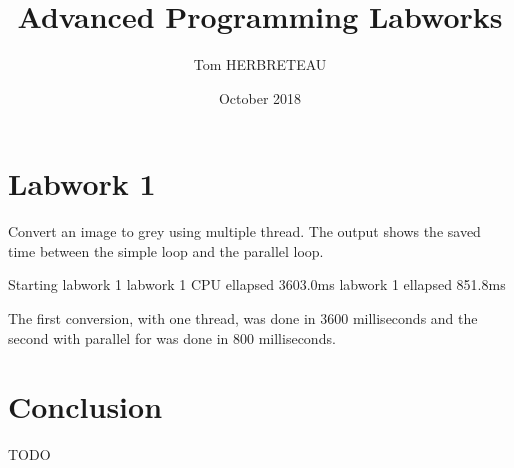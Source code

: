 \documentclass{article}
\title{Advanced Programming Labworks}
\author{Tom HERBRETEAU }
\date{October 2018}
\begin{document}
\maketitle

\section{Labwork 1}
Convert an image to grey using multiple thread. The output shows the saved time between the simple loop and the parallel loop.

\newline Starting labwork 1
\newline labwork 1 CPU ellapsed 3603.0ms
\newline labwork 1 ellapsed 851.8ms

The first conversion, with one thread, was done in 3600 milliseconds and the second with parallel for was done in 800 milliseconds.
\section{Conclusion}
TODO


\end{document}
